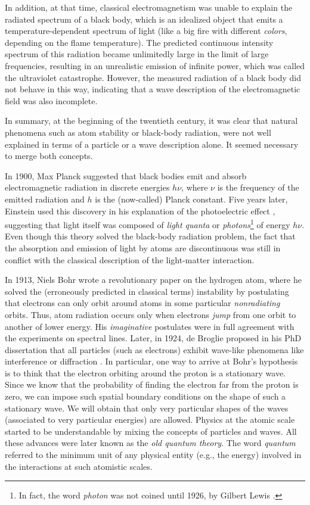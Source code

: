 \documentclass[nofootinbib, secnumarabic, amsmath, nobibnotes,11pt,aps,pra, floatfix]{revtex4-1}
\begin{document}
In addition, at that time, classical electromagnetism was unable to
explain the radiated spectrum of a black body, which is an idealized
object that emits a temperature-dependent spectrum of light (like a
big fire with different \textit{colors}, depending on
the flame temperature). The predicted continuous intensity spectrum
of this radiation became unlimitedly large in the limit of large frequencies,
resulting in an unrealistic emission of infinite power, which was
called the ultraviolet catastrophe. However, the measured radiation
of a black body did not behave in this way, indicating that a wave
description of the electromagnetic field was also incomplete.

In summary, at the beginning of the twentieth century, it was clear that natural phenomena such as atom stability or black-body radiation, were not well explained in terms of a particle or a wave description alone. It seemed necessary to merge both concepts.

In 1900, Max Planck suggested \cite{om.Planck-BlackBody} that black
bodies emit and absorb electromagnetic radiation in discrete
energies $h\nu$, where $\nu$ is the frequency of the emitted
radiation and $h$ is the (now-called) Planck constant. Five years
later, Einstein used this discovery in his explanation of the
photoelectric effect \cite{om.Einstein-Photoelectric}, suggesting
that light itself was composed of \textit{light quanta} or
\textit{photons}\footnote{In fact, the word \textit{photon} was not
coined until 1926, by Gilbert Lewis \cite{om.gilbert1926}.} of
energy $h\nu$. Even though this theory solved the black-body
radiation problem, the fact that the absorption and emission of
light by atoms are discontinuous was still in conflict with the
classical description of the light-matter interaction.

In 1913, Niels Bohr \cite{om.bohr,om.bohr2,om.bohr3} wrote a
revolutionary paper on the hydrogen atom, where he solved the
(erroneously predicted in classical terms) instability by
postulating that electrons can only orbit around atoms in some
particular \textit{nonradiating} orbits. Thus, atom radiation occurs only when electrons \textit{jump} from one orbit to another of lower
energy. His \textit{imaginative} postulates were in full agreement
with the experiments on spectral lines. Later, in 1924, de Broglie
proposed in his PhD dissertation that all particles (such as
electrons) exhibit wave-like phenomena like interference or
diffraction \cite{om.debroglie1923}. In particular, one way to
arrive at Bohr's hypothesis is to think that the electron orbiting
around the proton is a stationary wave. Since we know that the probability of finding the electron far from the proton is zero, we can impose such spatial boundary conditions on the shape of such a stationary wave. We will obtain that only very particular shapes of the waves (associated to very particular energies) are allowed. Physics at the
atomic scale started to be understandable by mixing the concepts of
particles and waves. All these advances were later known as the
\textit{old quantum theory}. The word \textit{quantum} referred to
the minimum unit of any physical entity (e.g., the energy) involved
in the interactions at such atomistic scales.
\end{document}
